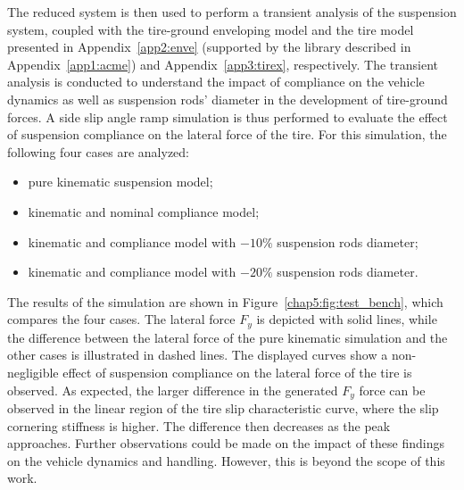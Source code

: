 The reduced system is then used to perform a transient analysis of the suspension system, coupled with the tire-ground enveloping model and the tire model presented in Appendix~\ref{app2:enve} (supported by the \Acme{} \cpp{} library described in Appendix~\ref{app1:acme}) and Appendix~\ref{app3:tirex}, respectively. The transient analysis is conducted to understand the impact of compliance on the vehicle dynamics as well as suspension rods' diameter in the development of tire-ground forces. A side slip angle ramp simulation is thus performed to evaluate the effect of suspension compliance on the lateral force of the tire. For this simulation, the following four cases are analyzed:
%
\begin{itemize}
  \setlength\itemsep{0.0em}
  \item pure kinematic suspension model;
  \item kinematic and nominal compliance model;
  \item kinematic and compliance model with $-10\%$ suspension rods diameter;
  \item kinematic and compliance model with $-20\%$ suspension rods diameter.
\end{itemize}
%
The results of the simulation are shown in Figure~\ref{chap5:fig:test_bench}, which compares the four cases. The lateral force $F_y$ is depicted with solid lines, while the difference between the lateral force of the pure kinematic simulation and the other cases is illustrated in dashed lines. The displayed curves show a non-negligible effect of suspension compliance on the lateral force of the tire is observed. As expected, the larger difference in the generated $F_y$ force can be observed in the linear region of the tire slip characteristic curve, where the slip cornering stiffness is higher. The difference then decreases as the peak approaches. Further observations could be made on the impact of these findings on the vehicle dynamics and handling. However, this is beyond the scope of this work.

